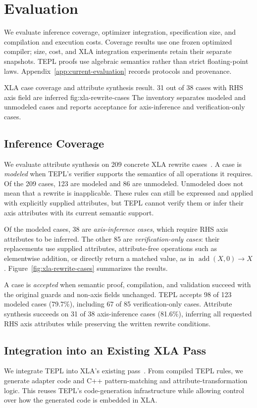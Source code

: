 \section{Evaluation}
\label{sec:evaluation}
We evaluate inference coverage, optimizer integration,
specification size, and compilation and execution costs. Coverage results
use one frozen optimized compiler; size, cost, and XLA integration
experiments retain their separate snapshots. TEPL proofs
use algebraic semantics rather than strict floating-point laws.
Appendix~\ref{app:current-evaluation} records protocols and provenance.

{XLA case coverage and attribute synthesis result. 31 out of 38 cases with RHS axis field are inferred}
{fig:xla-rewrite-cases}
{The inventory separates modeled and unmodeled cases and reports
acceptance for axis-inference and verification-only cases.}

\subsection{Inference Coverage}
We evaluate attribute synthesis on 209 concrete XLA rewrite
cases~\cite{xla-evaluation-source}. A case is \emph{modeled} when
TEPL's verifier supports the semantics of all operations it requires.
Of the 209 cases, 123 are modeled and 86 are unmodeled.
Unmodeled does not mean that a rewrite is inapplicable.
These rules can still be expressed and applied with explicitly supplied
attributes, but TEPL cannot verify them or infer their axis attributes
with its current semantic support.

Of the modeled cases, 38 are \emph{axis-inference cases}, which require
RHS axis attributes to be inferred. The other 85 are
\emph{verification-only cases}: their replacements use supplied attributes,
attribute-free operations such as elementwise addition, or directly
return a matched value, as in $\operatorname{add}(X,0)\to X$.
Figure~\ref{fig:xla-rewrite-cases} summarizes the results.

A case is \emph{accepted} when semantic proof, compilation, and
validation succeed with the original guards and non-axis fields
unchanged. TEPL accepts 98 of 123 modeled cases (79.7\%),
including 67 of 85 verification-only cases.
Attribute synthesis succeeds on 31 of 38 axis-inference cases
(81.6\%), inferring all requested RHS axis attributes while preserving
the written rewrite conditions.

\subsection{Integration into an Existing XLA Pass}
\label{sec:evaluation-xla-integration}
We integrate TEPL into XLA's existing 
pass~\cite{xla-evaluation-source}. From compiled TEPL rules, we generate
adapter code and C++ pattern-matching and attribute-transformation logic.
This reuses TEPL's code-generation infrastructure while allowing
control over how the generated code is embedded in XLA.

